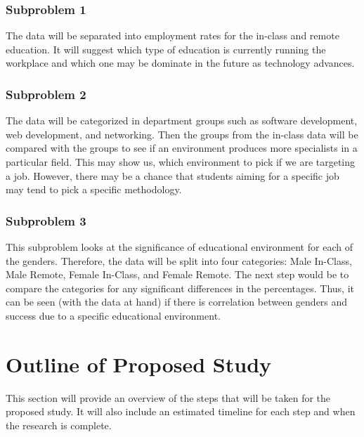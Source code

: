 \documentclass[titlepage]{article}
\begin{document}
\subsubsection{Subproblem 1}
The data will be separated into employment rates for the in-class and remote education.
It will suggest which type of education is currently running the workplace and which one
may be dominate in the future as technology advances.  

\subsubsection{Subproblem 2}
The data will be categorized in department groups such as software development, web development, and
networking.  Then the groups from the in-class data will be compared with the groups to see if an
environment produces more specialists in a particular field.  This may show us, which environment
to pick if we are targeting a job.  However, there may be a chance that students aiming for a
specific job may tend to pick a specific methodology.

\subsubsection{Subproblem 3}
This subproblem looks at the significance of educational environment for each of the genders.
Therefore, the data will be split into four categories: Male In-Class, Male Remote, Female In-Class,
and Female Remote.  The next step would be to compare the categories for any significant differences
in the percentages.  Thus, it can be seen (with the data at hand) if there is correlation between
genders and success due to a specific educational environment.

\clearpage

\section{Outline of Proposed Study}
This section will provide an overview of the steps that will be taken for the proposed study.
It will also include an estimated timeline for each step and when the research is complete.
\end{document}
